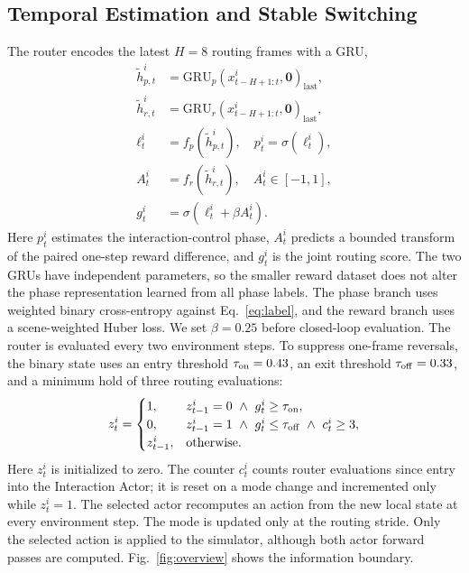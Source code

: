 \documentclass[letterpaper,10pt,conference]{ieeeconf}
\begin{document}
\subsection{Temporal Estimation and Stable Switching}
The router encodes the latest $H=8$ routing frames with a GRU,
\begin{equation}
 \begin{aligned}
 \tilde h_{p,t}^i&=\mathrm{GRU}_{p}(x_{t-H+1:t}^i,\mathbf{0})_{\mathrm{last}},\\
 \tilde h_{r,t}^i&=\mathrm{GRU}_{r}(x_{t-H+1:t}^i,\mathbf{0})_{\mathrm{last}},\\
 \ell_t^i&=f_p(\tilde h_{p,t}^i),\quad p_t^i=\sigma(\ell_t^i),\\
 A_t^i&=f_r(\tilde h_{r,t}^i),\quad A_t^i\in[-1,1],\\
 g_t^i&=\sigma\!\left(\ell_t^i+\beta A_t^i\right).
 \end{aligned}
 \label{eq:gru}
\end{equation}
Here $p_t^i$ estimates the interaction-control phase, $A_t^i$ predicts a bounded transform of the paired one-step reward difference, and $g_t^i$ is the joint routing score. The two GRUs have independent parameters, so the smaller reward dataset does not alter the phase representation learned from all phase labels. The phase branch uses weighted binary cross-entropy against Eq.~\eqref{eq:label}, and the reward branch uses a scene-weighted Huber loss. We set $\beta=0.25$ before closed-loop evaluation. The router is evaluated every two environment steps. To suppress one-frame reversals, the binary state uses an entry threshold $\tau_{\rm on}=0.43$, an exit threshold $\tau_{\rm off}=0.33$, and a minimum hold of three routing evaluations:
\begin{equation}
 z_t^i=\begin{cases}
 1,&z_{t-1}^i=0\ \land\ g_t^i\geq\tau_{\rm on},\\
 0,&z_{t-1}^i=1\ \land\ g_t^i\leq\tau_{\rm off}\ \land\ c_t^i\geq 3,\\
 z_{t-1}^i,&\text{otherwise.}
 \end{cases}
 \label{eq:hysteresis}
\end{equation}
Here $z_t^i$ is initialized to zero. The counter $c_t^i$ counts router evaluations since entry into the Interaction Actor; it is reset on a mode change and incremented only while $z_t^i=1$. The selected actor recomputes an action from the new local state at every environment step. The mode is updated only at the routing stride. Only the selected action is applied to the simulator, although both actor forward passes are computed. Fig.~\ref{fig:overview} shows the information boundary.
\end{document}
